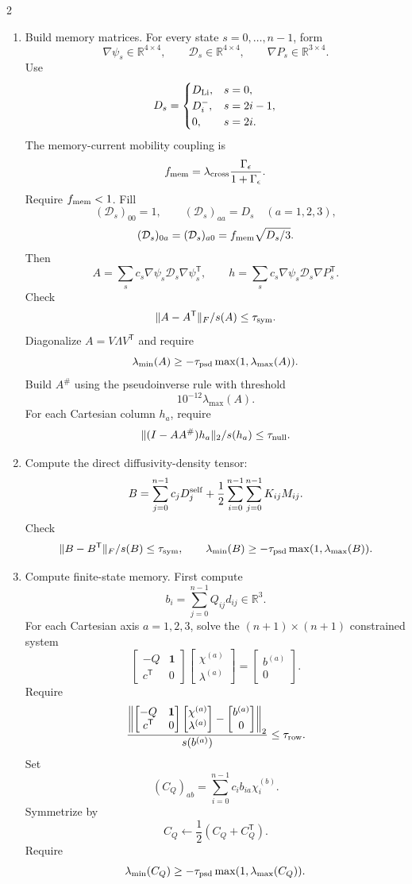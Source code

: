 \documentclass[10pt]{article}
\newcommand{\R}{\mathbb{R}}
\newcommand{\T}{\mathsf{T}}
\newcommand{\one}{\mathbf{1}}
\begin{document}
\begin{multicols}{2}
\begin{enumerate}[label=\textbf{A\arabic*.}]
\item Build memory matrices. For every state \(s=0,\ldots,n-1\), form
\[
\nabla\psi_s\in\R^{4\times4},
\qquad
\mathcal D_s\in\R^{4\times4},
\qquad
\nabla P_s\in\R^{3\times4}.
\]
Use
\[
D_s=
\begin{cases}
D_{\rm Li}, & s=0,\\
D_i^-, & s=2i-1,\\
0, & s=2i.
\end{cases}
\]
The memory-current mobility coupling is
\[
f_{\rm mem}
=
\lambda_{\rm cross}
\frac{\Gamma_\epsilon}{1+\Gamma_\epsilon}.
\]
Require \(f_{\rm mem}<1\). Fill
\[
(\mathcal D_s)_{00}=1,
\qquad
(\mathcal D_s)_{aa}=D_s\quad(a=1,2,3),
\]
\[
(\mathcal D_s)_{0a}=(\mathcal D_s)_{a0}
=
f_{\rm mem}\sqrt{D_s/3}.
\]
Then
\[
A=\sum_s c_s\nabla\psi_s\mathcal D_s\nabla\psi_s^\T,
\qquad
h=\sum_s c_s\nabla\psi_s\mathcal D_s\nabla P_s^\T.
\]
Check
\[
\|A-A^\T\|_F/s(A)\le\tau_{\rm sym}.
\]
Diagonalize \(A=V\Lambda V^\T\) and require
\[
\lambda_{\min}(A)\ge-\tau_{\rm psd}\max(1,\lambda_{\max}(A)).
\]
Build \(A^\#\) using the pseudoinverse rule with threshold
\[
10^{-12}\lambda_{\max}(A).
\]
For each Cartesian column \(h_a\), require
\[
\|(I-AA^\#)h_a\|_2/s(h_a)\le\tau_{\rm null}.
\]

\item Compute the direct diffusivity-density tensor:
\[
B=\sum_{j=0}^{n-1}c_jD_j^{\rm self}
+\frac12\sum_{i=0}^{n-1}\sum_{j=0}^{n-1}K_{ij}M_{ij}.
\]
Check
\[
\|B-B^\T\|_F/s(B)\le\tau_{\rm sym},
\qquad
\lambda_{\min}(B)\ge-\tau_{\rm psd}\max(1,\lambda_{\max}(B)).
\]

\item Compute finite-state memory. First compute
\[
b_i=\sum_{j=0}^{n-1}Q_{ij}d_{ij}\in\R^3.
\]
For each Cartesian axis \(a=1,2,3\), solve the \((n+1)\times(n+1)\)
constrained system
\[
\begin{bmatrix}
-Q & \one\\
c^\T & 0
\end{bmatrix}
\begin{bmatrix}
\chi^{(a)}\\
\lambda^{(a)}
\end{bmatrix}
=
\begin{bmatrix}
b^{(a)}\\
0
\end{bmatrix}.
\]
Require
\[
\frac{
\left\|
\begin{bmatrix}
-Q & \one\\
c^\T & 0
\end{bmatrix}
\begin{bmatrix}
\chi^{(a)}\\
\lambda^{(a)}
\end{bmatrix}
-
\begin{bmatrix}
b^{(a)}\\
0
\end{bmatrix}
\right\|_2
}{s(b^{(a)})}
\le\tau_{\rm row}.
\]
Set
\[
(C_Q)_{ab}=\sum_{i=0}^{n-1}c_i b_{ia}\chi_i^{(b)}.
\]
Symmetrize by
\[
C_Q\leftarrow\frac12(C_Q+C_Q^\T).
\]
Require
\[
\lambda_{\min}(C_Q)\ge-\tau_{\rm psd}\max(1,\lambda_{\max}(C_Q)).
\]


\end{enumerate}
\end{multicols}
\end{document}
